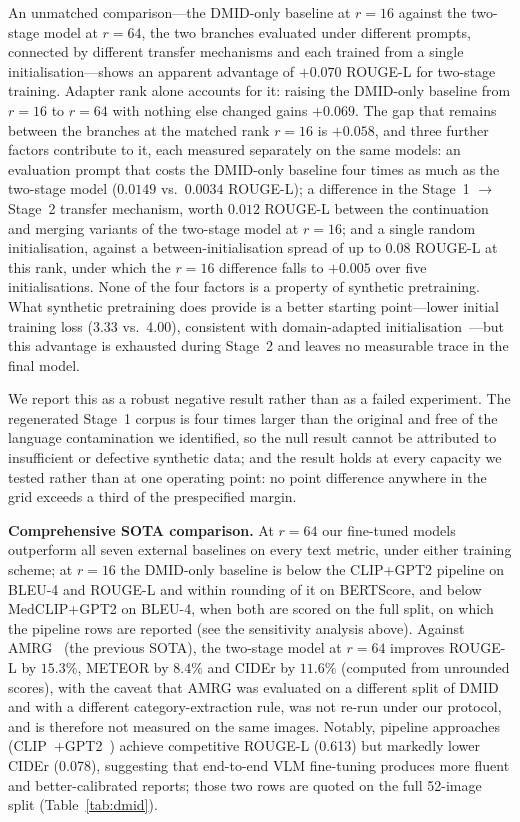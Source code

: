 \documentclass{wlscirep}
\begin{document}
An unmatched comparison---the DMID-only baseline at $r=16$ against the two-stage model at $r=64$, the two branches evaluated under different prompts, connected by different transfer mechanisms and each trained from a single initialisation---shows an apparent advantage of $+0.070$ ROUGE-L for two-stage training. Adapter rank alone accounts for it: raising the DMID-only baseline from $r=16$ to $r=64$ with nothing else changed gains $+0.069$. The gap that remains between the branches at the matched rank $r=16$ is $+0.058$, and three further factors contribute to it, each measured separately on the same models: an evaluation prompt that costs the DMID-only baseline four times as much as the two-stage model ($0.0149$ vs.\ $0.0034$ ROUGE-L); a difference in the Stage~1 $\rightarrow$ Stage~2 transfer mechanism, worth $0.012$ ROUGE-L between the continuation and merging variants of the two-stage model at $r=16$; and a single random initialisation, against a between-initialisation spread of up to $0.08$ ROUGE-L at this rank, under which the $r=16$ difference falls to $+0.005$ over five initialisations. None of the four factors is a property of synthetic pretraining. What synthetic pretraining does provide is a better starting point---lower initial training loss (3.33 vs.\ 4.00), consistent with domain-adapted initialisation~\cite{bengio2012deep, pan2010transfer}---but this advantage is exhausted during Stage~2 and leaves no measurable trace in the final model.

We report this as a robust negative result rather than as a failed experiment. The regenerated Stage~1 corpus is four times larger than the original and free of the language contamination we identified, so the null result cannot be attributed to insufficient or defective synthetic data; and the result holds at every capacity we tested rather than at one operating point: no point difference anywhere in the grid exceeds a third of the prespecified margin.

\textbf{Comprehensive SOTA comparison.} At $r=64$ our fine-tuned models outperform all seven external baselines on every text metric, under either training scheme; at $r=16$ the DMID-only baseline is below the CLIP+GPT2 pipeline on BLEU-4 and ROUGE-L and within rounding of it on BERTScore, and below MedCLIP+GPT2 on BLEU-4, when both are scored on the full split, on which the pipeline rows are reported (see the sensitivity analysis above). Against AMRG~\cite{sung2025} (the previous SOTA), the two-stage model at $r=64$ improves ROUGE-L by $15.3\%$, METEOR by $8.4\%$ and CIDEr by $11.6\%$ (computed from unrounded scores), with the caveat that AMRG was evaluated on a different split of DMID and with a different category-extraction rule, was not re-run under our protocol, and is therefore not measured on the same images. Notably, pipeline approaches (CLIP~\cite{radford2021clip}+GPT2~\cite{radford2019gpt2}) achieve competitive ROUGE-L (0.613) but markedly lower CIDEr (0.078), suggesting that end-to-end VLM fine-tuning produces more fluent and better-calibrated reports; those two rows are quoted on the full 52-image split (Table~\ref{tab:dmid}).
\end{document}
